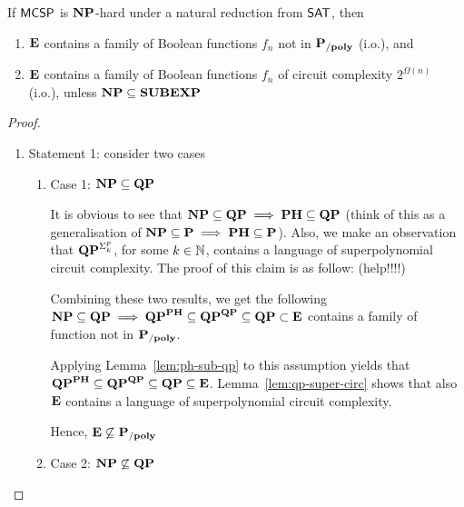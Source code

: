 \documentclass[12pt]{article}
\theoremstyle{definition}
\begin{document}
\bigskip

\begin{theorem}[Theorem 15]
If $\mathsf{MCSP}$ is $\mathbf{NP}$-hard under a natural reduction from $\mathsf{SAT}$, then
\begin{enumerate} [1.]
	\item $\mathbf{E}$ contains a family of Boolean functions $f_n$ not in $\mathbf{P_{/poly}}$ (i.o.), and
	\item $\mathbf{E}$ contains a family of Boolean functions $f_n$ of circuit complexity $2^{\Omega(n)}$ (i.o.), unless $\mathbf{NP} \subseteq \mathbf{SUBEXP}$
\end{enumerate}
\end{theorem}

\begin{proof}
\begin{enumerate}[-]
	\item Statement 1: consider two cases
	\begin{enumerate} [+]
		\item Case 1: $\mathbf{NP} \subseteq \mathbf{QP}$
		
      {\color{gray}
      It is obvious to see that $\mathbf{NP} \subseteq \mathbf{QP} \implies \mathbf{PH} \subseteq \mathbf{QP}$ (think of this as a generalisation of $\mathbf{NP} \subseteq \mathbf{P} \implies \mathbf{PH} \subseteq \mathbf{P}$). Also, we make an observation that $\mathbf{QP}^{\Sigma_k^p}$, for some $k \in {\mathbb{N}}$, contains a language of superpolynomial circuit complexity. The proof of this claim is as follow: (help!!!!)
		
		Combining these two results, we get the following $\mathbf{NP} \subseteq \mathbf{QP} \implies \mathbf{QP}^{\mathbf{PH}} \subseteq \mathbf{QP}^{\mathbf{QP}} \subseteq \mathbf{QP} \subset \mathbf{E}$ contains a family of function not in $\mathbf{P_{/poly}}$.}

      Applying Lemma~\ref{lem:ph-sub-qp} to this assumption yields that
      $\mathbf{QP}^{\mathbf{PH}} \subseteq \mathbf{QP}^{\mathbf{QP}} \subseteq
       \mathbf{QP} \subseteq \mathbf{E}$.
      Lemma~\ref{lem:qp-super-circ} shows that also $\mathbf{E}$ contains
      a language of superpolynomial circuit complexity.

		
		Hence, $\mathbf{E} \not\subseteq \mathbf{P_{/poly}}$\\
		
		\item Case 2: $\mathbf{NP} \not\subseteq \mathbf{QP}$
		

\end{enumerate}
\end{enumerate}
\end{proof}
\end{document}
